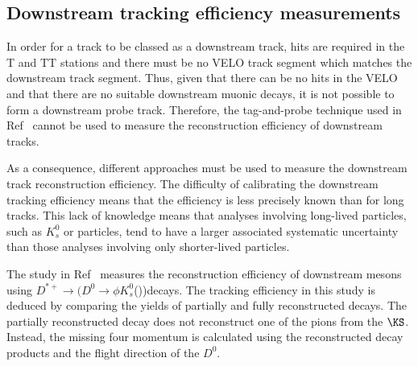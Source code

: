 \subsection{Downstream tracking efficiency measurements}
\label{sec:patDD}
In order for a track to be classed as a downstream track, hits are required in the T and TT stations and there must be no VELO track segment which matches the downstream track segment. Thus, given that there can be no hits in the VELO and that there are no suitable downstream muonic decays, it is not possible to form a downstream probe track. Therefore, the tag-and-probe technique used in  Ref~\cite{LHCB-DP-2013-002} cannot be used to measure the reconstruction efficiency of downstream tracks. %

As a consequence, different approaches must be used to measure the downstream track reconstruction efficiency. The difficulty of calibrating the downstream tracking efficiency means that the efficiency is less precisely known than for long tracks. This lack of knowledge means that analyses involving long-lived particles, such as $K_{s}^{0}$ or \Lz particles, tend to have a larger associated systematic uncertainty than those analyses involving only shorter-lived particles. 


The study in Ref~\cite{DDpat} measures the reconstruction efficiency of downstream \KS mesons using $D^{*+}\to(D^{0} \to \phi K^{0}_{s}$(\to \pip\pim))\pip decays. The tracking efficiency in this study is deduced by comparing the yields of partially and fully reconstructed decays. The partially reconstructed decay does not reconstruct one of the pions from the $\KS$. Instead, the missing four momentum is calculated using the reconstructed decay products and the flight direction of the $D^{0}$.



